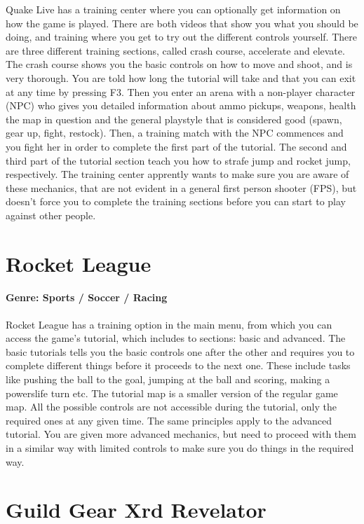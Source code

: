 Quake Live has a training center where you can optionally get information on how the game is played. There are both videos that show you what you should be doing, and training where you get to try out the different controls yourself. There are three different training sections, called crash course, accelerate and elevate. The crash course shows you the basic controls on how to move and shoot, and is very thorough. You are told how long the tutorial will take and that you can exit at any time by pressing F3. Then you enter an arena with a non-player character (NPC) who gives you detailed information about ammo pickups, weapons, health the map in question and the general playstyle that is considered good (spawn, gear up, fight, restock). Then, a training match with the NPC commences and you fight her in order to complete the first part of the tutorial. The second and third part of the tutorial section teach you how to strafe jump and rocket jump, respectively. The training center apprently wants to make sure you are aware of these mechanics, that are not evident in a general first person shooter (FPS), but doesn't force you to complete the training sections before you can start to play against other people.

\section{Rocket League}

\paragraph{Genre: Sports / Soccer / Racing}

Rocket League has a training option in the main menu, from which you can access the game's tutorial, which includes to sections: basic and advanced.
The basic tutorials tells you the basic controls one after the other and requires you to complete different things before it proceeds to the next one. These include tasks like pushing the ball to the goal, jumping at the ball and scoring, making a powerslife turn etc. The tutorial map is a smaller version of the regular game map. All the possible controls are not accessible during the tutorial, only the required ones at any given time.
The same principles apply to the advanced tutorial. You are given more advanced mechanics, but need to proceed with them in a similar way with limited controls to make sure you do things in the required way.

\section{Guild Gear Xrd Revelator}

